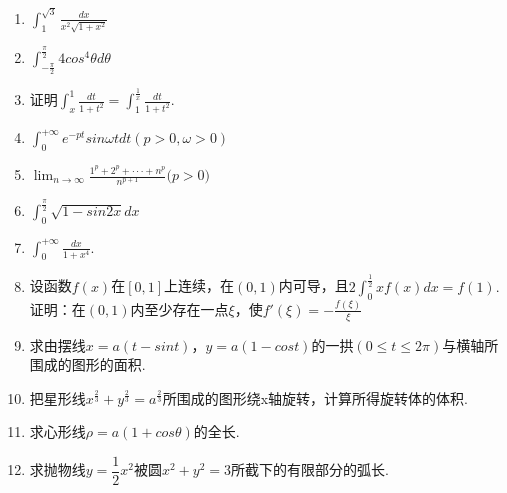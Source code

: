 \documentclass[UTF8]{ctexart}
\begin{document}
\begin{enumerate}[(1)]
\item $\displaystyle{\int_1^{\sqrt{3}} \frac{dx}{x^2\sqrt{1+x^2} } }$
\item $\displaystyle{\int_{-\frac{\pi}{2}}^\frac{\pi}{2} 4cos^4\theta d\theta} $
\item 证明$\displaystyle{\int _x^1 \frac{dt}{1+t^2}=\int_1^{\frac{1}{x}} \frac{dt}{1+t^2}.}$
\item $\displaystyle{\int_0^{+\infty} e^{-pt}sin\omega tdt(p>0,\omega>0)}$


\item $\displaystyle{\lim_{n\to \infty} \frac{1^p+2^p+\cdot\cdot\cdot+n^p}{n^{p+1}}(p>0})$
\item $\displaystyle{\int_0^{\frac{\pi}{2}} \sqrt{1-sin2x}dx}$
\item $\displaystyle{\int_0^{+\infty} \frac{dx}{1+x^4}}.$
\item 设函数$f(x)$在$[0,1]$上连续，在$(0,1)$内可导，且$2\displaystyle{\int_0^{\frac{1}{2}} xf(x)dx=f(1).}$证明：在$(0,1)$内至少存在一点$\xi$，使$f'(\xi)=-\displaystyle{\frac{f(\xi)}{\xi}}$
\item 求由摆线$x=a(t-sint)$，$y=a(1-cost)$的一拱$(0\leq t\leq 2\pi)$与横轴所围成的图形的面积.
\item 把星形线$\displaystyle{x^{\frac{2}{3}}+y^{\frac{2}{3}}=a^{\frac{2}{3}}}$所围成的图形绕x轴旋转，计算所得旋转体的体积.
\item 求心形线$\rho =a(1+cos\theta)$的全长.
\item 求抛物线$y=\dfrac{1}{2}x^2$被圆$x^2+y^2=3$所截下的有限部分的弧长.

\end{enumerate}
\end{document}
